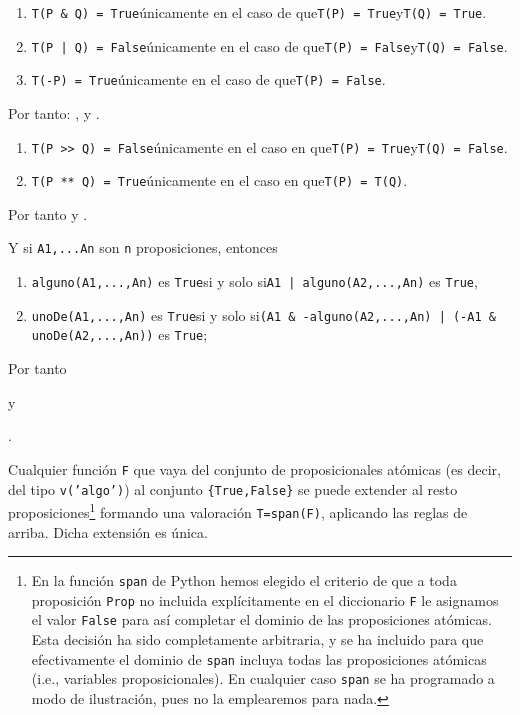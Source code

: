 \documentclass[10pt,a4paper]{report}
\begin{document}
\begin{enumerate}
\item \texttt{T(P \& Q) = True}\quad únicamente en el caso de que\quad \texttt{T(P) = True}\quad y\quad \texttt{T(Q) = True}.
\item \texttt{T(P | Q) = False}\quad únicamente en el caso de que\quad \texttt{T(P) = False}\quad y\quad \texttt{T(Q) = False}.
\item \texttt{T(-P) = True}\quad únicamente en el caso de que\quad \texttt{T(P) = False}.
\end{enumerate}
Por tanto:
,\qquad
{}\quad y \quad
{}.
\begin{enumerate}
\item \texttt{T(P >{}>{} Q) = False}\quad únicamente en el caso en que\quad \texttt{T(P) = True}\quad y\quad \texttt{T(Q) = False}.
\item \texttt{T(P ** Q) = True}\quad únicamente en el caso en que\quad \texttt{T(P) = T(Q)}.
\end{enumerate}
Por tanto\quad
{}
\quad y\quad
{}.

Y si \texttt{A1,...An} son \texttt{n} proposiciones, entonces
\begin{enumerate}
\item \texttt{alguno(A1,...,An)} es \texttt{True}\quad si y solo si\quad \texttt{A1 | alguno(A2,...,An)} es \texttt{True},
\item \texttt{unoDe(A1,...,An)} es \texttt{True}\quad si y solo si\quad \texttt{(A1 \& -alguno(A2,...,An) | (-A1 \& unoDe(A2,...,An))} es \texttt{True};
\end{enumerate}
Por tanto
\begin{center}
\end{center}
y
\begin{center}
.
\end{center}
Cualquier función \texttt{F} que vaya del conjunto de proposicionales atómicas (es decir, del tipo \texttt{v('algo')}) al conjunto \texttt{\{True,False\}}
se puede extender al resto proposiciones\footnote{En la función \texttt{span} de Python hemos elegido el criterio de que a toda proposición \texttt{Prop} no incluida explícitamente en el diccionario \texttt{F} le asignamos el valor \texttt{False} para así completar el dominio de las proposiciones atómicas.
Esta decisión ha sido completamente arbitraria, y se ha incluido para que efectivamente el dominio de \texttt{span} incluya todas las proposiciones atómicas (i.e., variables proposicionales).
En cualquier caso \texttt{span} se ha programado a modo de ilustración, pues no la emplearemos para nada.}
formando una valoración \texttt{T=span(F)}, aplicando las reglas de arriba.
Dicha extensión es única.
\end{document}
